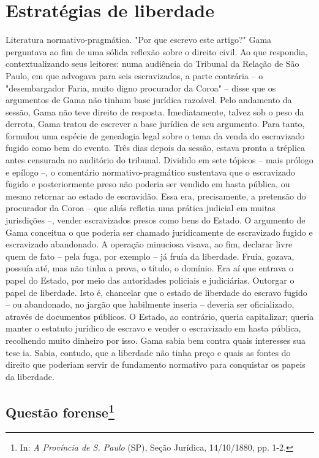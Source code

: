 \part{Estratégias de liberdade}

\pagebreak
\mbox{}\vfill
\thispagestyle{empty}

{\small\noindent
Literatura normativo-pragmática. "Por que escrevo este artigo?"
Gama perguntava ao fim de uma sólida reflexão sobre o direito civil. Ao
que respondia, contextualizando seus leitores: numa audiência do
Tribunal da Relação de São Paulo, em que advogava para seis
escravizados, a parte contrária -- o "desembargador Faria, muito digno
procurador da Coroa" -- disse que os argumentos de Gama não tinham base
jurídica razoável. Pelo andamento da sessão, Gama não teve direito de
resposta. Imediatamente, talvez sob o peso da derrota, Gama tratou de
escrever a base jurídica de seu argumento. Para tanto, formulou uma
espécie de genealogia legal sobre o tema da venda do escravizado fugido
como bem do evento. Três dias depois da sessão, estava pronta a tréplica
antes censurada no auditório do tribunal. Dividido em sete tópicos --
mais prólogo e epílogo --, o comentário normativo-pragmático sustentava
que o escravizado fugido e posteriormente preso não poderia ser vendido
em hasta pública, ou mesmo retornar ao estado de escravidão. Essa era,
precisamente, a pretensão do procurador da Coroa -- que aliás refletia
uma prática judicial em muitas jurisdições --, vender escravizados
presos como bens do Estado. O argumento de Gama conceitua o que poderia
ser chamado juridicamente de escravizado fugido e escravizado
abandonado. A operação minuciosa visava, ao fim, declarar livre quem de
fato -- pela fuga, por exemplo -- já fruía da liberdade. Fruía, gozava,
possuía até, mas não tinha a prova, o título, o domínio. Era aí que
entrava o papel do Estado, por meio das autoridades policiais e
judiciárias. Outorgar o papel de liberdade. Isto é, chancelar que o
estado de liberdade do escravo fugido -- ou abandonado, no jargão que
habilmente inseria -- deveria ser oficializado, através de documentos
públicos. O Estado, ao contrário, queria capitalizar; queria manter o
estatuto jurídico de escravo e vender o escravizado em hasta pública,
recolhendo muito dinheiro por isso. Gama sabia bem contra quais
interesses sua tese ia. Sabia, contudo, que a liberdade não tinha preço
e quais as fontes do direito que poderiam servir de fundamento normativo
para conquistar os papeis da liberdade.}

\chapter{Questão forense\footnote[*]{In: \emph{A Província de S.
  Paulo} (SP), Seção Jurídica, 14/10/1880, pp. 1-2.}}


